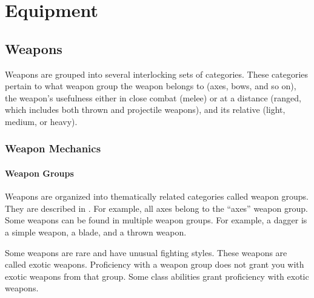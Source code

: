 \chapter{Equipment}

\section{Weapons}\label{Weapons}

    Weapons are grouped into several interlocking sets of categories. These categories pertain to what weapon group the weapon belongs to (axes, bows, and so on), the weapon's usefulness either in close combat (melee) or at a distance (ranged, which includes both thrown and projectile weapons), and its relative  (light, medium, or heavy).

    \subsection{Weapon Mechanics}

        \subsubsection{Weapon Groups}\label{Weapon Groups}

            Weapons are organized into thematically related categories called weapon groups. They are described in . For example, all axes belong to the ``axes'' weapon group. Some weapons can be found in multiple weapon groups. For example, a dagger is a simple weapon, a blade, and a thrown weapon.

            \label{Exotic Weapons} Some weapons are rare and have unusual fighting styles.
            These weapons are called exotic weapons.
            Proficiency with a weapon group does not grant you with exotic weapons from that group.
            Some class abilities grant proficiency with exotic weapons.

